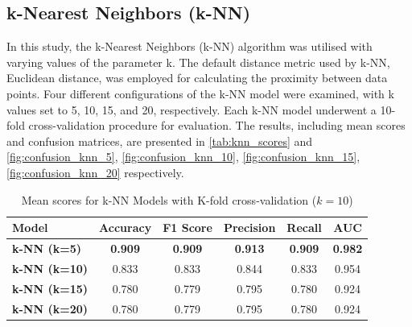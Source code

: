 \subsection*{k-Nearest Neighbors (k-NN)}
In this study, the k-Nearest Neighbors (k-NN) algorithm was utilised with varying values of the parameter k. The default distance metric used by k-NN, Euclidean distance, was employed for calculating the proximity between data points. Four different configurations of the k-NN model were examined, with k values set to 5, 10, 15, and 20, respectively. Each k-NN model underwent a 10-fold cross-validation procedure for evaluation. The results, including mean scores and confusion matrices, are presented in \autoref{tab:knn_scores} and \autoref{fig:confusion_knn_5}, \autoref{fig:confusion_knn_10}, \autoref{fig:confusion_knn_15}, \autoref{fig:confusion_knn_20} respectively.


\begin{table}[H]
    \centering
    \begin{tabular}{|l|c|c|c|c|c|}
    \hline
    \textbf{Model} & \textbf{Accuracy} & \textbf{F1 Score} & \textbf{Precision} & \textbf{Recall} & \textbf{AUC} \\ \hline
    \textbf{k-NN (k=5)} & \textbf{0.909} & \textbf{0.909} & \textbf{0.913} & \textbf{0.909} & \textbf{0.982} \\
    \textbf{k-NN (k=10)} & 0.833 & 0.833 & 0.844 & 0.833 & 0.954 \\
    \textbf{k-NN (k=15)} & 0.780 & 0.779 & 0.795 & 0.780 & 0.924 \\
    \textbf{k-NN (k=20)} & 0.780 & 0.779 & 0.795 & 0.780 & 0.924 \\ \hline
    \end{tabular}
    \caption{Mean scores for k-NN Models with K-fold cross-validation ($k=10$)}
    \label{tab:knn_scores}
\end{table}

